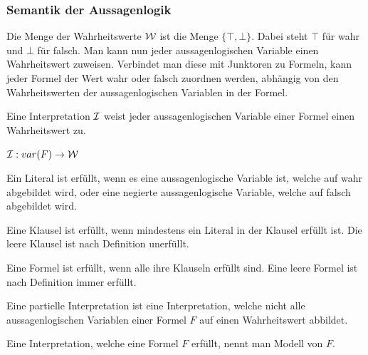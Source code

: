   \subsubsection{Semantik der Aussagenlogik}
  Die Menge der Wahrheitswerte ${\cal W}$ ist die Menge
  $\{\top,\bot\}$. Dabei steht $\top$ für wahr und $\bot$
  für falsch. Man kann nun jeder aussagenlogischen Variable
  einen Wahrheitswert zuweisen. Verbindet man diese mit
  Junktoren zu Formeln, kann jeder Formel der Wert
  wahr oder falsch zuordnen werden, abhängig von den
  Wahrheitswerten der aussagenlogischen Variablen in der
  Formel.
  \begin{definition}
    Eine Interpretation ${\cal I}$ weist jeder
    aussagenlogischen Variable einer Formel einen
    Wahrheitswert zu.
    \begin{center}
    ${\cal I}: var(F)\rightarrow{\cal W}$
    \end{center}
  \end{definition}
  \begin{definition}
    Ein Literal ist erfüllt, wenn es eine
    aussagenlogische Variable ist, welche auf wahr
    abgebildet wird, oder eine negierte aussagenlogische
    Variable, welche auf falsch abgebildet wird.
  \end{definition}
  \begin{definition}
    Eine Klausel ist erfüllt, wenn mindestens ein Literal
    in der Klausel erfüllt ist. Die leere Klausel ist
    nach Definition unerfüllt.
  \end{definition}
  \begin{definition}
    Eine Formel ist erfüllt, wenn alle ihre Klauseln
    erfüllt sind. Eine leere Formel ist nach Definition
    immer erfüllt.
  \end{definition}
  \begin{definition}
    Eine partielle Interpretation ist eine
    Interpretation, welche nicht alle aussagenlogischen
    Variablen einer Formel $F$ auf einen Wahrheitswert
    abbildet.
  \end{definition}
  \begin{definition}
    Eine Interpretation, welche eine Formel $F$ erfüllt, 
    nennt man Modell von $F$.
  \end{definition}
